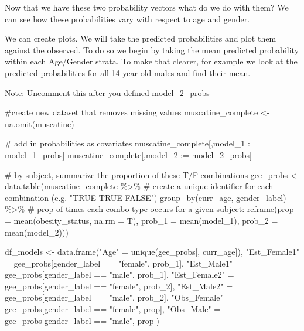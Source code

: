 \documentclass[
  letterpaper,
  DIV=11,
  numbers=noendperiod]{scrreprt}
\newenvironment{Shaded}{\begin{snugshade}}{\end{snugshade}}
\newcommand{\AttributeTok}[1]{\textcolor[rgb]{0.40,0.45,0.13}{#1}}
\newcommand{\CommentTok}[1]{\textcolor[rgb]{0.37,0.37,0.37}{#1}}
\newcommand{\ErrorTok}[1]{\textcolor[rgb]{0.68,0.00,0.00}{#1}}
\newcommand{\FunctionTok}[1]{\textcolor[rgb]{0.28,0.35,0.67}{#1}}
\newcommand{\NormalTok}[1]{\textcolor[rgb]{0.00,0.23,0.31}{#1}}
\newcommand{\OtherTok}[1]{\textcolor[rgb]{0.00,0.23,0.31}{#1}}
\newcommand{\SpecialCharTok}[1]{\textcolor[rgb]{0.37,0.37,0.37}{#1}}
\newcommand{\StringTok}[1]{\textcolor[rgb]{0.13,0.47,0.30}{#1}}
\begin{document}
Now that we have these two probability vectors what do we do with them?
We can see how these probabilities vary with respect to age and gender.

We can create plots. We will take the predicted probabilities and plot
them against the observed. To do so we begin by taking the mean
predicted probability within each Age/Gender strata. To make that
clearer, for example we look at the predicted probabilities for all 14
year old males and find their mean.

Note: Uncomment this after you defined model\_2\_probs

\begin{Shaded}
\begin{Highlighting}[]
\CommentTok{\#create new dataset that removes missing values}
\NormalTok{muscatine\_complete }\OtherTok{\textless{}{-}} \FunctionTok{na.omit}\NormalTok{(muscatine)}

\CommentTok{\# add in probabilities as covariates}
\NormalTok{muscatine\_complete[,model\_1 }\SpecialCharTok{:}\ErrorTok{=}\NormalTok{ model\_1\_probs]}
\NormalTok{muscatine\_complete[,model\_2 }\SpecialCharTok{:}\ErrorTok{=}\NormalTok{ model\_2\_probs]}

\CommentTok{\# by subject, summarize the proportion of these T/F combinations }
\NormalTok{gee\_probs }\OtherTok{\textless{}{-}} \FunctionTok{data.table}\NormalTok{(muscatine\_complete }\SpecialCharTok{\%\textgreater{}\%}
  \CommentTok{\# create a unique identifier for each combination (e.g. "TRUE{-}TRUE{-}FALSE")}
  \FunctionTok{group\_by}\NormalTok{(curr\_age, gender\_label) }\SpecialCharTok{\%\textgreater{}\%}
  \CommentTok{\# prop of times each combo type occurs for a given subject:}
  \FunctionTok{reframe}\NormalTok{(}\AttributeTok{prop =} \FunctionTok{mean}\NormalTok{(obesity\_status, }\AttributeTok{na.rm =}\NormalTok{ T),}
          \AttributeTok{prob\_1 =} \FunctionTok{mean}\NormalTok{(model\_1),}
          \AttributeTok{prob\_2 =} \FunctionTok{mean}\NormalTok{(model\_2)))}

\NormalTok{df\_models }\OtherTok{\textless{}{-}} \FunctionTok{data.frame}\NormalTok{(}\StringTok{"Age"} \OtherTok{=} \FunctionTok{unique}\NormalTok{(gee\_probs[, curr\_age]),}
                    \StringTok{"Est\_Female1"} \OtherTok{=}\NormalTok{ gee\_probs[gender\_label }\SpecialCharTok{==} \StringTok{"female"}\NormalTok{, prob\_1],}
                    \StringTok{"Est\_Male1"} \OtherTok{=}\NormalTok{ gee\_probs[gender\_label }\SpecialCharTok{==} \StringTok{"male"}\NormalTok{, prob\_1],}
                    \StringTok{"Est\_Female2"} \OtherTok{=}\NormalTok{ gee\_probs[gender\_label }\SpecialCharTok{==} \StringTok{"female"}\NormalTok{, prob\_2],}
                    \StringTok{"Est\_Male2"} \OtherTok{=}\NormalTok{ gee\_probs[gender\_label }\SpecialCharTok{==} \StringTok{"male"}\NormalTok{, prob\_2],}
                     \StringTok{"Obs\_Female"} \OtherTok{=}\NormalTok{ gee\_probs[gender\_label }\SpecialCharTok{==} \StringTok{"female"}\NormalTok{, prop],}
                     \StringTok{"Obs\_Male"} \OtherTok{=}\NormalTok{ gee\_probs[gender\_label }\SpecialCharTok{==} \StringTok{"male"}\NormalTok{, prop])}
\end{Highlighting}
\end{Shaded}
\end{document}
